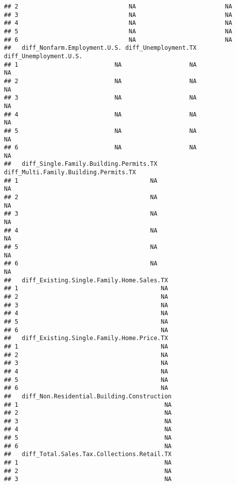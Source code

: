\documentclass[
]{article}
\begin{document}
\begin{verbatim}
## 2                               NA                         NA
## 3                               NA                         NA
## 4                               NA                         NA
## 5                               NA                         NA
## 6                               NA                         NA
##   diff_Nonfarm.Employment.U.S. diff_Unemployment.TX diff_Unemployment.U.S.
## 1                           NA                   NA                     NA
## 2                           NA                   NA                     NA
## 3                           NA                   NA                     NA
## 4                           NA                   NA                     NA
## 5                           NA                   NA                     NA
## 6                           NA                   NA                     NA
##   diff_Single.Family.Building.Permits.TX diff_Multi.Family.Building.Permits.TX
## 1                                     NA                                    NA
## 2                                     NA                                    NA
## 3                                     NA                                    NA
## 4                                     NA                                    NA
## 5                                     NA                                    NA
## 6                                     NA                                    NA
##   diff_Existing.Single.Family.Home.Sales.TX
## 1                                        NA
## 2                                        NA
## 3                                        NA
## 4                                        NA
## 5                                        NA
## 6                                        NA
##   diff_Existing.Single.Family.Home.Price.TX
## 1                                        NA
## 2                                        NA
## 3                                        NA
## 4                                        NA
## 5                                        NA
## 6                                        NA
##   diff_Non.Residential.Building.Construction
## 1                                         NA
## 2                                         NA
## 3                                         NA
## 4                                         NA
## 5                                         NA
## 6                                         NA
##   diff_Total.Sales.Tax.Collections.Retail.TX
## 1                                         NA
## 2                                         NA
## 3                                         NA

\end{verbatim}
\end{document}
